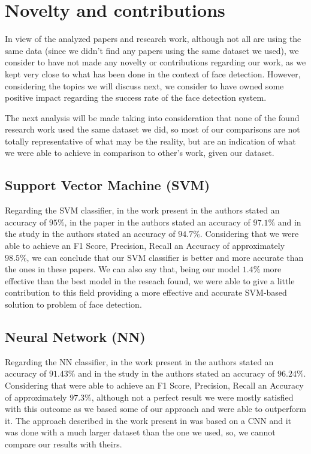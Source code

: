 \section{Novelty and contributions} \label{novelty}

In view of the analyzed papers and research work, although not all are using the same data (since we didn't find any papers using the same dataset we used), we consider to have not made any novelty or contributions regarding our work, as we kept very close to what has been done in the context of face detection. However, considering the topics we will discuss next, we consider to have owned some positive impact regarding the success rate of the face detection system. 

The next analysis will be made taking into consideration that none of the found research work used the same dataset we did, so most of our comparisons are not totally representative of what may be the reality, but are an indication of what we were able to achieve in comparison to other's work, given our dataset.

\subsection{Support Vector Machine (SVM)}
Regarding the SVM classifier, in the work present in \cite{1619082} the authors stated an accuracy of \(95\%\), in the paper in \cite{609310} the authors stated an accuracy of \(97.1\%\) and in the study in \cite{5076875} the authors stated an accuracy of \(94.7\%\). Considering that we were able to achieve an F1 Score, Precision, Recall an Accuracy of approximately \(98.5\%\), we can conclude that our SVM classifier is better and more accurate than the ones in these papers.  We can also say that, being our model \(1.4\%\) more effective than the best model in the reseach found, we were able to give a little contribution to this field providing a more effective and accurate SVM-based solution to problem of face detection. 

\subsection{Neural Network (NN)}
Regarding the NN classifier, in the work present in \cite{5233453} the authors stated an accuracy of \(91.43\%\) and in the study in \cite{8858529} the authors stated an accuracy of \(96.24\%\). Considering that were able to achieve an F1 Score, Precision, Recall an Accuracy of approximately \(97.3\%\), although not a perfect result we were mostly satisfied with this outcome as we based some of our approach \cite{5233453} and were able to outperform it. The approach described in the work present in \cite{8858529} was based on a CNN and it was done with a much larger dataset than the one we used, so, we cannot compare our results with theirs. 

